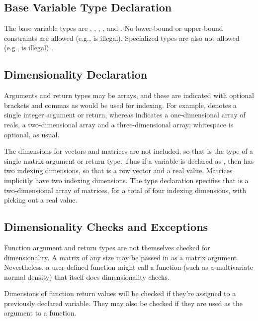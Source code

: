 \subsection{Base Variable Type Declaration}

The base variable types are , ,
, , and .  No lower-bound
or upper-bound constraints are allowed (e.g.,  is
illegal).  Specialized types are also not allowed (e.g.,
 is illegal) .

\subsection{Dimensionality Declaration}

Arguments and return types may be arrays, and these are indicated with
optional brackets and commas as would be used for indexing.  For
example,  denotes a single integer argument or return,
whereas  indicates a one-dimensional array of reals,
 a two-dimensional array and  a
three-dimensional array; whitespace is optional, as usual.  

The dimensions for vectors and matrices are not included, so that
 is the type of a single matrix argument or return type.
Thus if a variable is declared as , then  has
two indexing dimensions, so that  is a row vector and
 a real value.  Matrices implicitly have two indexing
dimensions.  The type declaration  specifies that
 is a two-dimensional array of matrices, for a total of four
indexing dimensions, with  picking out a real value.

\subsection{Dimensionality Checks and Exceptions}

Function argument and return types are not themselves checked for
dimensionality.  A matrix of any size may be passed in as a matrix
argument.  Nevertheless, a user-defined function might call a function
(such as a multivariate normal density) that itself does
dimensionality checks.

Dimensions of function return values will be checked if they're
assigned to a previously declared variable.  They may also be checked
if they are used as the argument to a function.  

